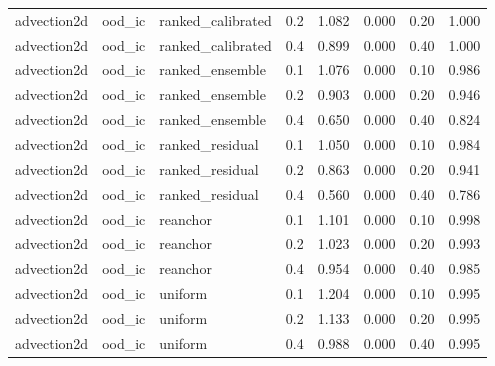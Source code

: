 \begin{longtable}{llllrrrr}
advection2d & ood\_ic & ranked\_calibrated & 0.2 & 1.082 & 0.000 & 0.20 & 1.000 \\
advection2d & ood\_ic & ranked\_calibrated & 0.4 & 0.899 & 0.000 & 0.40 & 1.000 \\
advection2d & ood\_ic & ranked\_ensemble & 0.1 & 1.076 & 0.000 & 0.10 & 0.986 \\
advection2d & ood\_ic & ranked\_ensemble & 0.2 & 0.903 & 0.000 & 0.20 & 0.946 \\
advection2d & ood\_ic & ranked\_ensemble & 0.4 & 0.650 & 0.000 & 0.40 & 0.824 \\
advection2d & ood\_ic & ranked\_residual & 0.1 & 1.050 & 0.000 & 0.10 & 0.984 \\
advection2d & ood\_ic & ranked\_residual & 0.2 & 0.863 & 0.000 & 0.20 & 0.941 \\
advection2d & ood\_ic & ranked\_residual & 0.4 & 0.560 & 0.000 & 0.40 & 0.786 \\
advection2d & ood\_ic & reanchor & 0.1 & 1.101 & 0.000 & 0.10 & 0.998 \\
advection2d & ood\_ic & reanchor & 0.2 & 1.023 & 0.000 & 0.20 & 0.993 \\
advection2d & ood\_ic & reanchor & 0.4 & 0.954 & 0.000 & 0.40 & 0.985 \\
advection2d & ood\_ic & uniform & 0.1 & 1.204 & 0.000 & 0.10 & 0.995 \\
advection2d & ood\_ic & uniform & 0.2 & 1.133 & 0.000 & 0.20 & 0.995 \\
advection2d & ood\_ic & uniform & 0.4 & 0.988 & 0.000 & 0.40 & 0.995 \\
\midrule
\end{longtable}
